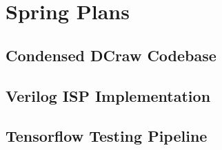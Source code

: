 \documentclass{report}
\begin{document}
\chapter{Spring Plans}

\appendix

\section{Condensed DCraw Codebase}

\section{Verilog ISP Implementation}

\section{Tensorflow Testing Pipeline}
\end{document}
